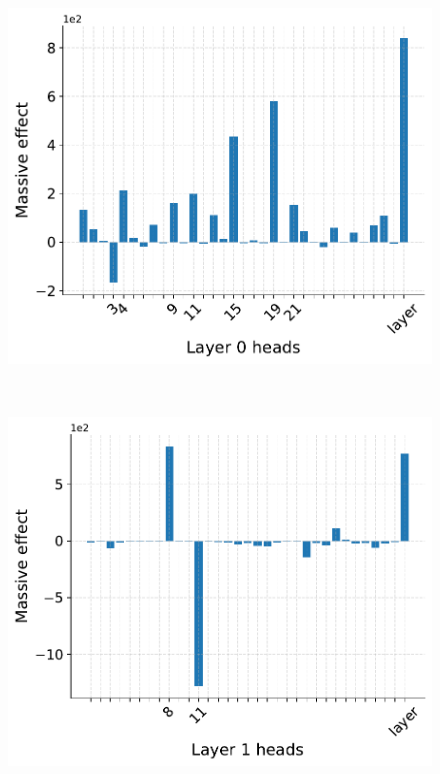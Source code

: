 \begin{figure}[t]
  \centering
  \begin{minipage}{0.33\textwidth}
      \centering
      \label{fig:appendix-ablation-massive-sup-zero-0}
      \vspace{-.2em}
      \includegraphics[width=\linewidth]{Figures/figures_circuit/interventions/bos_zero_out/bos_massive_L0.pdf}
  \end{minipage}~
  \begin{minipage}{0.33\textwidth}
      \centering
      \label{fig:appendix-ablation-massive-sup-zero-1}
      \vspace{-.2em}
      \includegraphics[width=\linewidth]{Figures/figures_circuit/interventions/bos_zero_out/bos_massive_L1.pdf}

\end{minipage}
\end{figure}
